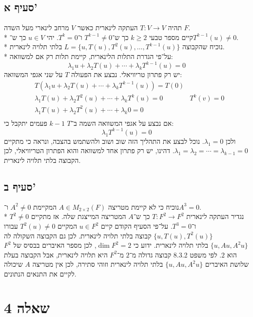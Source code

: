 \documentclass[a4paper,10pt]{article}
\begin{document}
\begin{hebrew}
	\subsection{סעיף א'}
	תהיה $T: V \to V$ העתקה לינארית כאשר $V$ מרחב לינארי מעל השדה $F$. \\*
	קיים מספר טבעי $k \ge 2$ כך ש־$T^{k - 1} \ne 0$ ו־$T^k = 0$.
	יהי $u \in V$ כך ש־$T^{k - 1}(u) \ne 0$. \\*
	נוכיח שהקבוצה $L = \{u, T(u), T^2(u), \hdots, T^{k-1}(u)\}$ 
	בלתי תלויה לינארית. \\*
	על־פי הגדרת התלות הלינארית, קיימת תלות רק אם למשוואה:
	\[
		\lambda_1 u + \lambda_2 T(u) + \cdots + \lambda_{k} T^{k - 1}(u) = 0
	\]
	יש רק פתרון טריוויאלי.
	נבצע את הפעולה $T$ על שני אגפי המשוואה:
	\begin{align*}
		& T(\lambda_1 u + \lambda_2 T(u) +
		\cdots + \lambda_{k} T^{k - 1}(u)) = T(0) \\
		& \lambda_1 T(u) + \lambda_2 T^2(u) +
		\cdots + \lambda_{k} T^k(u) = 0
		& T^k(v) = 0 \\
		& \lambda_1 T(u) + \lambda_2 T^2(u) +
		\cdots + \lambda_{k} 0 = 0 \\
	\end{align*}
	אם נבצע על אגפי המשוואה השמה ב־$T$ $k-1$ פעמים יתקבל כי:
	\[
		\lambda_1 T^{k - 1}(u) = 0
	\]
	ולכן $\lambda_1 = 0$. נוכל לבצע את התהליך הזה שוב ושוב ולהשתמש בהצבה,
	ונראה כי מתקיים $\lambda_1 = \lambda_2 = \cdots = \lambda_{k - 1} = 0$.
	דהינו, יש רק פתרון אחד למשוואה והוא הפתרון הטריוויאלי,
	לכן הקבוצה בלתי תלויה לינארית.

	\subsection{סעיף ב'}
	נוכיח כי לא קיימת מטריצה $A \in M_{2 \times 2}(F)$
	המקיימת $A^2 \ne 0$ ו־$A^3 = 0$. \\*
	נגדיר העתקה לינארית $T: F^2 \to F^2$ כך ש־$A$ המטריצה המייצגת שלה.
	אז מתקיים $T^2 \ne 0$ ו־$T^3 = 0$. על־פי הסעיף הקודם קיים $u \in F^2$
	המקיים $T^2(u) \ne 0$ עבורו $\{u, T(u), T^2(u)\}$ קבוצה בלתי תלויה לינארית.
	לכן גם הקבוצה השקולה לה $\{u, Au, A^2 u\}$ בלתי תלויה לינארית.
	ידוע כי $\dim F^2 = 2$, לכן מספר האיברים בבסיס של $F^2$ הוא $2$.
	לפי משפט 8.3.2 קבוצה גדולה מ־$2$ מ־$F^2$ היא תלויה לינארית,
	אבל הקבוצה בעלת שלושת האיברים $\{u, Au, A^2u\}$ בלתי תלויה לינארית
	וזוהי סתירה, לכן אין מטריצה $A$ שיכולה לקיים את התנאים הנתונים.

	\section{שאלה 4}

\end{hebrew}
\end{document}
